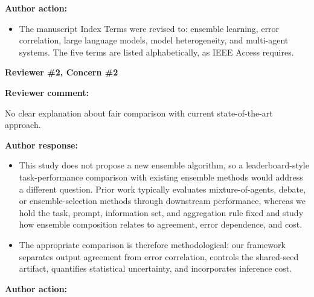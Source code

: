 \documentclass[11pt]{article}
\newcommand{\rvcomment}[1]{{\color{ReviewerGreen}#1}}
\newcommand{\concern}[1]{\textbf{\color{ReviewerGreen}#1}}
\begin{document}
\textbf{Author action:}

\begin{itemize}

\item The manuscript Index Terms were revised to: ensemble learning, error correlation, large language models, model heterogeneity, and multi-agent systems. The five terms are listed alphabetically, as IEEE Access requires.

\end{itemize}

\vspace{12pt}
\concern{Reviewer \#2, Concern \#2}

\concern{Reviewer comment:}

\rvcomment{No clear explanation about fair comparison with current state-of-the-art approach.}

\textbf{Author response:}

\begin{itemize}

\item This study does not propose a new ensemble algorithm, so a leaderboard-style task-performance comparison with existing ensemble methods would address a different question. Prior work typically evaluates mixture-of-agents, debate, or ensemble-selection methods through downstream performance, whereas we hold the task, prompt, information set, and aggregation rule fixed and study how ensemble composition relates to agreement, error dependence, and cost.

\item The appropriate comparison is therefore methodological: our framework separates output agreement from error correlation, controls the shared-seed artifact, quantifies statistical uncertainty, and incorporates inference cost.

\end{itemize}

\textbf{Author action:}
\end{document}
